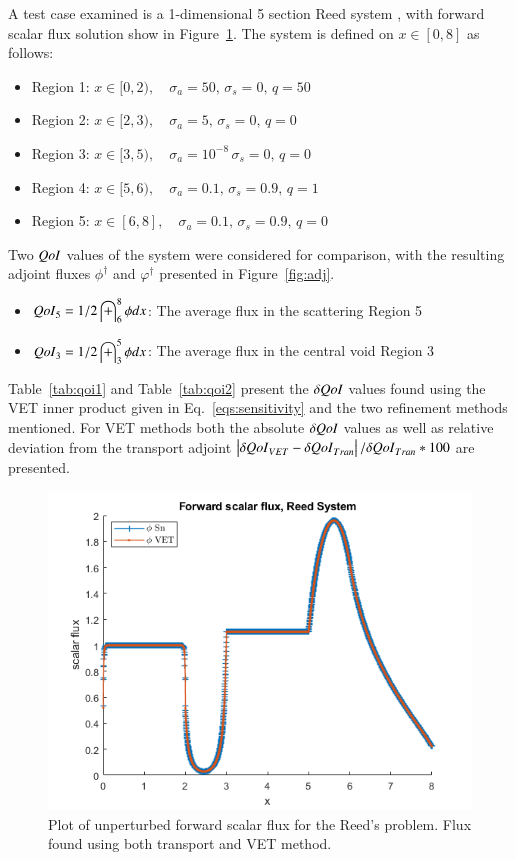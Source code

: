 \documentclass{anstrans}
\newcommand{\sigs}{\sigma_s}
\newcommand{\siga}{\sigma_a}
\newcommand{\qoi}{{\it QoI}\xspace}
\begin{document}
A test case examined is a 1-dimensional 5 section Reed system \cite{ReedProb}, with forward scalar flux solution show in Figure~\ref{fig:Flux4}. The system is defined on  $x \in [0,8]$ as follows:
\begin{itemize}
\item Region 1: $x \in [0,2), \quad \siga=50, \, 			\sigs=0, \, q=50$
\item Region 2: $x \in [2,3), \quad \siga=5, \, 			\sigs=0, \, q=0$
\item Region 3: $x \in [3,5), \quad \siga=10^{-8} \,	\sigs=0, \, q=0$
\item Region 4: $x \in [5,6), \quad \siga=0.1, \, 		\sigs=0.9, \, q=1$
\item Region 5: $x \in [6,8], \quad \siga=0.1, \, 		\sigs=0.9, \, q=0$
\end{itemize}
 Two $\qoi$ values of the system were considered for comparison, with the resulting adjoint fluxes $\phi^\dag$ and $\varphi^\dag$ presented in Figure~\ref{fig:adj}.
 
 \begin{itemize}
\item $\qoi_5 =1/2 \int_6^8 \phi dx $: The average flux in the scattering Region 5

\item $\qoi_3 =1/2 \int_3^5 \phi dx $: The average flux in the central void Region 3
 \end{itemize}

Table~\ref{tab:qoi1} and Table~\ref{tab:qoi2} present the $\delta \qoi$ values found using the VET inner product given in Eq.~\eqref{eqs:sensitivity} and the two refinement methods mentioned. For VET methods both the absolute $\delta \qoi$ values as well as relative deviation from the transport adjoint $ \left| \delta \qoi_{VET} - \delta \qoi_{Tran}\right|/ \delta \qoi_{Tran} * 100$ are presented.



\begin{figure}[h]
 \includegraphics[scale=0.5]{7phi.png}
 \caption{Plot of unperturbed forward scalar flux for the Reed's problem. Flux found using both transport and VET method.}
\label{fig:Flux4}
\end{figure}
\end{document}
